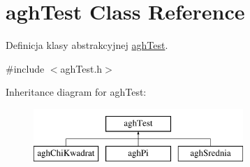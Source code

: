 \hypertarget{classaghTest}{\section{agh\-Test \-Class \-Reference}
\label{classaghTest}
}


\-Definicja klasy abstrakcyjnej \hyperlink{classaghTest}{agh\-Test}.  




{\ttfamily \#include $<$agh\-Test.\-h$>$}

\-Inheritance diagram for agh\-Test\-:\begin{figure}[H]
\begin{center}
\leavevmode
\includegraphics[height=2.000000cm]{classaghTest}
\end{center}
\end{figure}
